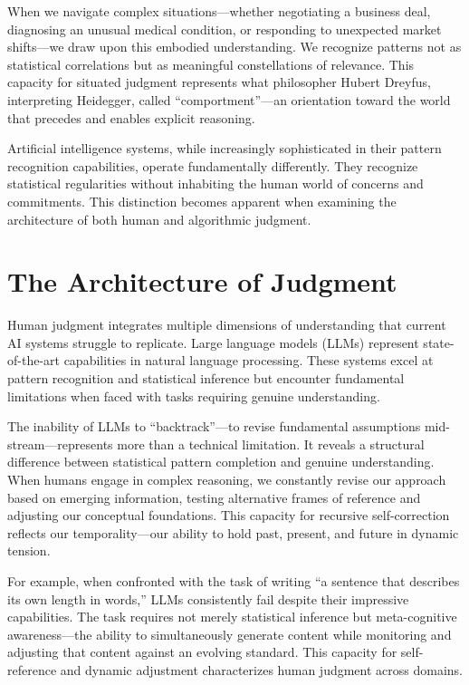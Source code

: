 \documentclass[
  Letterpaper,
]{scrbook}
\begin{document}
When we navigate complex situations---whether negotiating a business
deal, diagnosing an unusual medical condition, or responding to
unexpected market shifts---we draw upon this embodied understanding. We
recognize patterns not as statistical correlations but as meaningful
constellations of relevance. This capacity for situated judgment
represents what philosopher Hubert Dreyfus, interpreting Heidegger,
called ``comportment''---an orientation toward the world that precedes
and enables explicit reasoning.

Artificial intelligence systems, while increasingly sophisticated in
their pattern recognition capabilities, operate fundamentally
differently. They recognize statistical regularities without inhabiting
the human world of concerns and commitments. This distinction becomes
apparent when examining the architecture of both human and algorithmic
judgment.

\section{The Architecture of
Judgment}\label{the-architecture-of-judgment}

Human judgment integrates multiple dimensions of understanding that
current AI systems struggle to replicate. Large language models (LLMs)
represent state-of-the-art capabilities in natural language processing.
These systems excel at pattern recognition and statistical inference but
encounter fundamental limitations when faced with tasks requiring
genuine understanding.

The inability of LLMs to ``backtrack''---to revise fundamental
assumptions mid-stream---represents more than a technical limitation. It
reveals a structural difference between statistical pattern completion
and genuine understanding. When humans engage in complex reasoning, we
constantly revise our approach based on emerging information, testing
alternative frames of reference and adjusting our conceptual
foundations. This capacity for recursive self-correction reflects our
temporality---our ability to hold past, present, and future in dynamic
tension.

For example, when confronted with the task of writing ``a sentence that
describes its own length in words,'' LLMs consistently fail despite
their impressive capabilities. The task requires not merely statistical
inference but meta-cognitive awareness---the ability to simultaneously
generate content while monitoring and adjusting that content against an
evolving standard. This capacity for self-reference and dynamic
adjustment characterizes human judgment across domains.
\end{document}
